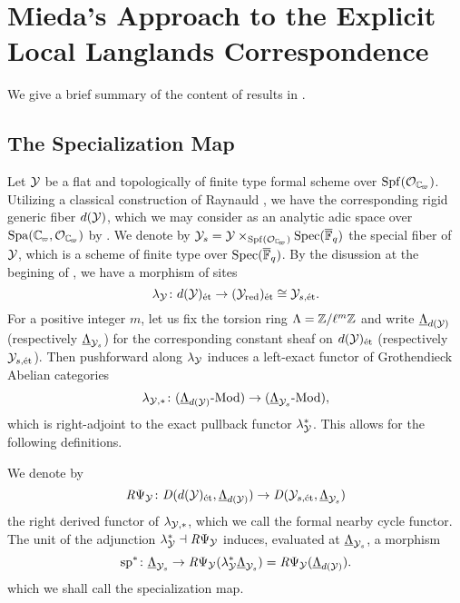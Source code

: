 \documentclass[../main.tex]{subfiles}
\begin{document}
\section{Mieda's Approach to the Explicit Local Langlands Correspondence} %
\label{sec:Mieda's Approach to the Explicit Local Langlands Correspondence}

We give a brief summary of the content of results in \cite{mieda2016geometric}.

\subsection{The Specialization Map} %
\label{sub:The Injectivity FinLevel}
Let $\mathcal{Y}$ be a flat and topologically of finite type formal scheme over $\Spf(\cO_\Cp)$.
Utilizing a classical construction of Raynauld \cite{raynaud1974geometrie}, we 
have the corresponding rigid generic fiber $d(\mathcal{Y})$, which we may
consider as an analytic adic space over $\Spa(\Cp,\cO_\Cp)$ by \cite[Section
1.9]{huber2013etale}. We denote by $\cY_s = \cY \times_{\Spf(\cO_\Cp)} \spec
(\Fqbar)$ the special fiber of $\mathcal{Y}$, which is a scheme of finite type over $\operatorname{Spec}(
{\overline {\mathbb{F}}_q})$. By the disussion at the begining of \cite[Section
3.5]{huber2013etale}, we have a morphism of sites
\begin{equation*}
  \lambda_{\mathcal{Y}} \colon d(\mathcal{Y})_{\textnormal{\'et}} \to (\mathcal{Y}_{\mathrm{red}})_{\textnormal{\'et}} \cong \mathcal{Y}_{s, \textnormal{\'et}}.
\end{equation*}
For a positive integer $m$, let us fix the torsion ring $\Lambda = \mathbb{Z}/\ell^m
\mathbb{Z}$ and write $\underline \Lambda_{d(\mathcal{Y})}$ (respectively $\underline
\Lambda_{\mathcal{Y}_{s}}$)
for the corresponding constant sheaf on $d(\mathcal{Y})_{\textnormal{\'et}}$ (respectively $\mathcal{Y}_{s,\textnormal{\'et}}$). Then 
pushforward along $\lambda_{\mathcal{Y}}$ induces a left-exact functor of Grothendieck
Abelian categories
\begin{equation*}
  \lambda_{\mathcal{Y},*}\colon {({\underline \Lambda_{d(\mathcal{Y})}}\textnormal-\allowbreak\mathrm{Mod})} \to {({\underline \Lambda_{\mathcal{Y}_{s}}}\textnormal-\allowbreak\mathrm{Mod})},
\end{equation*}
which is right-adjoint to the exact pullback functor $\lambda_{\mathcal{Y}}^*$.
This allows for the following definitions.

\begin{defi}\label{def:FormalNearbyCycleFunctor}
  We denote by
  \begin{equation*}
    \mathit R \Psi_{\mathcal{Y}}\colon \mathit D (d(\mathcal{Y})_{\textnormal{\'et}}, {\underline \Lambda_{d(\mathcal{Y})}}) \to
    \mathit D (\mathcal{Y}_{s, \textnormal{\'et}},{\underline \Lambda_{\mathcal{Y}_{s}}})
  \end{equation*}
  the right derived functor of $\lambda_{\mathcal{Y},*}$, which we call the formal nearby
  cycle functor. The unit of the adjunction $\lambda_{\mathcal{Y}}^* \dashv 
  \mathit R \Psi_{\mathcal{Y}}$ induces, evaluated at $\underline \Lambda_{\mathcal{Y}_{s}}$, a morphism
  \begin{equation*}
    \mathrm{sp}^* \colon \underline \Lambda_{\mathcal{Y}_{s}} \to 
    \mathit R \Psi_{\mathcal{Y}}( \lambda_{\mathcal{Y}}^* \underline \Lambda_{\mathcal{Y}_{s}}) = 
    \mathit R \Psi_{\mathcal{Y}}(\underline \Lambda_{d(\mathcal{Y})}).
  \end{equation*}
  which we shall call the specialization map.
\end{defi}
\end{document}
